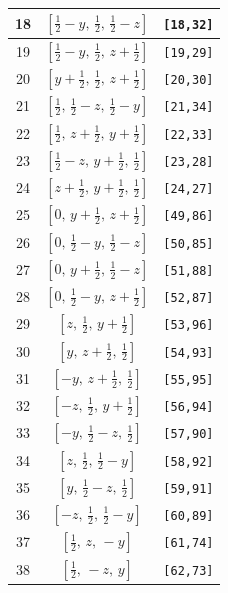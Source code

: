 \documentclass[fleqn,8pt]{jsarticle}
\begin{document}
\begin{longtable}{ccc}
18 & $\left[ \frac{1}{2} - y,\, \frac{1}{2},\, \frac{1}{2} - z \right]$ & {\tt [18,32]} \\ \hline
19 & $\left[ \frac{1}{2} - y,\, \frac{1}{2},\, z + \frac{1}{2} \right]$ & {\tt [19,29]} \\ \hline
20 & $\left[ y + \frac{1}{2},\, \frac{1}{2},\, z + \frac{1}{2} \right]$ & {\tt [20,30]} \\ \hline
21 & $\left[ \frac{1}{2},\, \frac{1}{2} - z,\, \frac{1}{2} - y \right]$ & {\tt [21,34]} \\ \hline
22 & $\left[ \frac{1}{2},\, z + \frac{1}{2},\, y + \frac{1}{2} \right]$ & {\tt [22,33]} \\ \hline
23 & $\left[ \frac{1}{2} - z,\, y + \frac{1}{2},\, \frac{1}{2} \right]$ & {\tt [23,28]} \\ \hline
24 & $\left[ z + \frac{1}{2},\, y + \frac{1}{2},\, \frac{1}{2} \right]$ & {\tt [24,27]} \\ \hline
25 & $\left[ 0,\, y + \frac{1}{2},\, z + \frac{1}{2} \right]$ & {\tt [49,86]} \\ \hline
26 & $\left[ 0,\, \frac{1}{2} - y,\, \frac{1}{2} - z \right]$ & {\tt [50,85]} \\ \hline
27 & $\left[ 0,\, y + \frac{1}{2},\, \frac{1}{2} - z \right]$ & {\tt [51,88]} \\ \hline
28 & $\left[ 0,\, \frac{1}{2} - y,\, z + \frac{1}{2} \right]$ & {\tt [52,87]} \\ \hline
29 & $\left[ z,\, \frac{1}{2},\, y + \frac{1}{2} \right]$ & {\tt [53,96]} \\ \hline
30 & $\left[ y,\, z + \frac{1}{2},\, \frac{1}{2} \right]$ & {\tt [54,93]} \\ \hline
31 & $\left[ - y,\, z + \frac{1}{2},\, \frac{1}{2} \right]$ & {\tt [55,95]} \\ \hline
32 & $\left[ - z,\, \frac{1}{2},\, y + \frac{1}{2} \right]$ & {\tt [56,94]} \\ \hline
33 & $\left[ - y,\, \frac{1}{2} - z,\, \frac{1}{2} \right]$ & {\tt [57,90]} \\ \hline
34 & $\left[ z,\, \frac{1}{2},\, \frac{1}{2} - y \right]$ & {\tt [58,92]} \\ \hline
35 & $\left[ y,\, \frac{1}{2} - z,\, \frac{1}{2} \right]$ & {\tt [59,91]} \\ \hline
36 & $\left[ - z,\, \frac{1}{2},\, \frac{1}{2} - y \right]$ & {\tt [60,89]} \\ \hline
37 & $\left[ \frac{1}{2},\, z,\, - y \right]$ & {\tt [61,74]} \\ \hline
38 & $\left[ \frac{1}{2},\, - z,\, y \right]$ & {\tt [62,73]} \\ \hline

\end{longtable}
\end{document}
